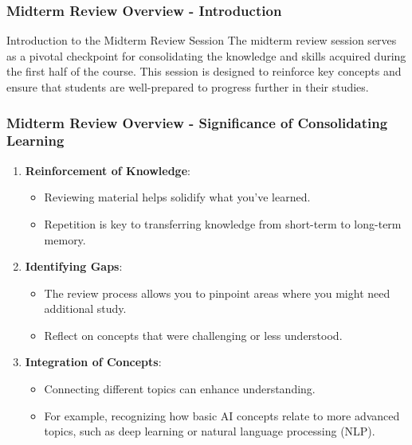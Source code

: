 \documentclass[aspectratio=169]{beamer}
\begin{document}
\frame{\titlepage}

\begin{frame}[fragile]
    \frametitle{Midterm Review Overview - Introduction}
    \begin{block}{Introduction to the Midterm Review Session}
        The midterm review session serves as a pivotal checkpoint for consolidating the knowledge and skills acquired during the first half of the course. This session is designed to reinforce key concepts and ensure that students are well-prepared to progress further in their studies.
    \end{block}
\end{frame}

\begin{frame}[fragile]
    \frametitle{Midterm Review Overview - Significance of Consolidating Learning}
    \begin{enumerate}
        \item \textbf{Reinforcement of Knowledge}:
        \begin{itemize}
            \item Reviewing material helps solidify what you've learned.
            \item Repetition is key to transferring knowledge from short-term to long-term memory.
        \end{itemize}
        
        \item \textbf{Identifying Gaps}:
        \begin{itemize}
            \item The review process allows you to pinpoint areas where you might need additional study.
            \item Reflect on concepts that were challenging or less understood.
        \end{itemize}
        
        \item \textbf{Integration of Concepts}:
        \begin{itemize}
            \item Connecting different topics can enhance understanding.
            \item For example, recognizing how basic AI concepts relate to more advanced topics, such as deep learning or natural language processing (NLP).
        \end{itemize}
    \end{enumerate}
\end{frame}
\end{document}

